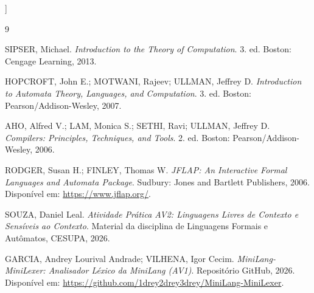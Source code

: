 \documentclass[10pt,a4paper,twocolumn]{article}
\begin{document}
]
\thispagestyle{firstpage}








\renewcommand{\refname}{Referências}
\begin{thebibliography}{9}\small\setlength{\itemsep}{2pt}

SIPSER, Michael. \textit{Introduction to the Theory of Computation}. 3. ed. Boston: Cengage Learning, 2013.

HOPCROFT, John E.; MOTWANI, Rajeev; ULLMAN, Jeffrey D. \textit{Introduction to Automata Theory, Languages, and Computation}. 3. ed. Boston: Pearson/Addison-Wesley, 2007.

AHO, Alfred V.; LAM, Monica S.; SETHI, Ravi; ULLMAN, Jeffrey D. \textit{Compilers: Principles, Techniques, and Tools}. 2. ed. Boston: Pearson/Addison-Wesley, 2006.

RODGER, Susan H.; FINLEY, Thomas W. \textit{JFLAP: An Interactive Formal Languages and Automata Package}. Sudbury: Jones and Bartlett Publishers, 2006. Disponível em: \url{https://www.jflap.org/}.

SOUZA, Daniel Leal. \textit{Atividade Prática AV2: Linguagens Livres de Contexto e Sensíveis ao Contexto}. Material da disciplina de Linguagens Formais e Autômatos, CESUPA, 2026.

GARCIA, Andrey Lourival Andrade; VILHENA, Igor Cecim. \textit{MiniLang-MiniLexer: Analisador Léxico da MiniLang (AV1)}. Repositório GitHub, 2026. Disponível em: \url{https://github.com/1drey2drey3drey/MiniLang-MiniLexer}.

\end{thebibliography}
\end{document}
